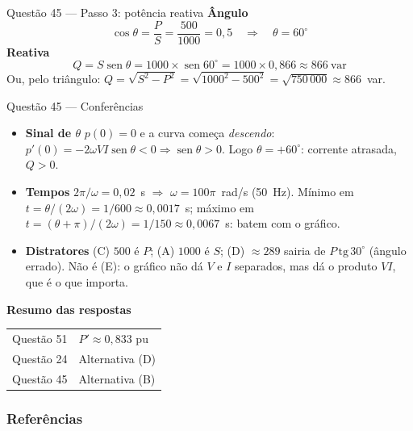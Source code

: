 \documentclass[aspectratio=169]{../../TemplateBeamerUFC/libs/ufc_format}
\providecommand{\sen}{\operatorname{sen}}   %
\newcommand{\passo}[1]{{\color{blue_theme}\bfseries #1}\enspace}
\begin{document}
\begin{frame}{Questão 45 --- Passo 3: potência reativa}
  \passo{Ângulo}
  \[
    \cos\theta = \frac{P}{S} = \frac{500}{1000} = 0{,}5
    \quad\Longrightarrow\quad \theta = 60^\circ
  \]
  \pause
  \passo{Reativa}
  \[
    Q = S\sen\theta = 1000 \times \sen 60^\circ = 1000 \times 0{,}866
      \approx 866~\text{var}
  \]
  \pause
  {\small Ou, pelo triângulo: $Q = \sqrt{S^2 - P^2} = \sqrt{1000^2 - 500^2}
  = \sqrt{750\,000} \approx 866$~var.}
  \pause
\end{frame}

\begin{frame}{Questão 45 --- Conferências}
  \small
  \begin{itemize}
    \item \passo{Sinal de $\theta$} $p(0) = 0$ e a curva começa
          \emph{descendo}: $p'(0) = -2\omega VI\sen\theta < 0
          \Rightarrow \sen\theta > 0$. Logo $\theta = +60^\circ$: corrente
          atrasada, $Q > 0$.
    \pause
    \item \passo{Tempos} $2\pi/\omega = 0{,}02$~s $\Rightarrow$ $\omega =
          100\pi$~rad/s (50~Hz). Mínimo em $t = \theta/(2\omega) = 1/600
          \approx 0{,}0017$~s; máximo em $t = (\theta + \pi)/(2\omega) =
          1/150 \approx 0{,}0067$~s: batem com o gráfico.
    \pause
    \item \passo{Distratores} (C) $500$ é $P$; (A) $1000$ é $S$; (D)
          $\approx 289$ sairia de $P\,\mathrm{tg}\,30^\circ$ (ângulo
          errado). Não é (E): o gráfico não dá $V$ e $I$ separados, mas dá o
          produto $VI$, que é o que importa.
  \end{itemize}
\end{frame}

\begin{frame}{}
  \centering
  \Large\textbf{Resumo das respostas}

  \vspace{1.2em}
  \begin{tabular}{rl}
    \toprule
    Questão 51 & $P' \approx 0{,}833$ pu \\[0.4em]
    Questão 24 & Alternativa (D) \\[0.4em]
    Questão 45 & Alternativa (B) \\
    \bottomrule
  \end{tabular}
\end{frame}

\begin{frame}[allowframebreaks]
  \frametitle{Referências}
  \nocite{bichels2018sep,borges2005analise,stevenson1986elementos}
  \printbibliography[heading=none]
\end{frame}
\end{document}
